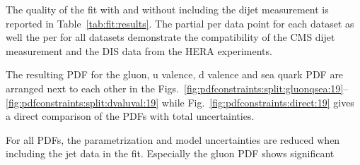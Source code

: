 The quality of the fit with and without including the dijet measurement is
reported in Table~\ref{tab:fit:results}. The partial \chisq per data point for
each dataset as well the \chisq per \ndof for all datasets demonstrate
the compatibility of the CMS dijet measurement and the DIS data from the HERA
experiments. 

The resulting PDF for the gluon, u valence, d valence and sea quark PDF are
arranged next to each other in the
Figs.~\ref{fig:pdfconstraints:split:gluonqsea:19}--\ref{fig:pdfconstraints:split:dvaluval:19}
while Fig.~\ref{fig:pdfconstraints:direct:19} gives a direct comparison of the
PDFs with total uncertainties. 

For all PDFs, the parametrization and model uncertainties are reduced when
including the jet data in the fit. Especially the gluon PDF shows significant

%

